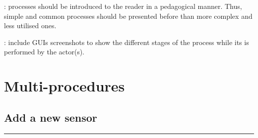 : processes should be introduced to the
reader in a pedagogical manner. Thus, simple and common processes should be presented before
than more complex and less utilised ones.

: include GUIs screenshots to show the
different stages of the process while its is performed by the actor(s).


\section{Multi-procedures}

\subsection{Add a new sensor}
\vspace{0.5cm}
\hfill
\hrule
